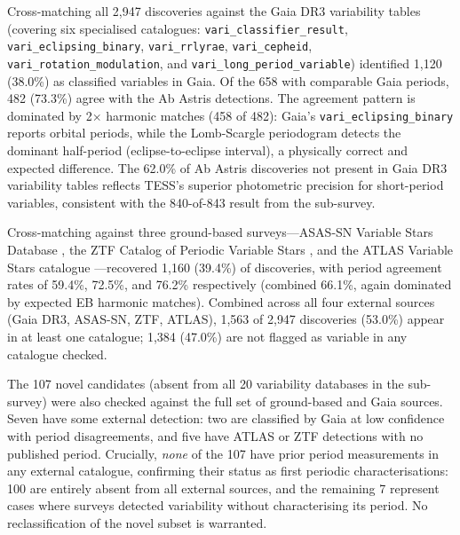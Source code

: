 \documentclass[11pt,a4paper]{article}
\begin{document}
Cross-matching all 2{,}947 discoveries against the Gaia DR3 variability tables (covering six specialised catalogues: \texttt{vari\_classifier\_result}, \texttt{vari\_eclipsing\_binary}, \texttt{vari\_rrlyrae}, \texttt{vari\_cepheid}, \texttt{vari\_rotation\_modulation}, and \texttt{vari\_long\_period\_variable}) identified 1{,}120 (38.0\%) as classified variables in Gaia. Of the 658 with comparable Gaia periods, 482 (73.3\%) agree with the Ab Astris detections. The agreement pattern is dominated by 2$\times$ harmonic matches (458 of 482): Gaia's \texttt{vari\_eclipsing\_binary} reports orbital periods, while the Lomb-Scargle periodogram detects the dominant half-period (eclipse-to-eclipse interval), a physically correct and expected difference. The 62.0\% of Ab Astris discoveries not present in Gaia DR3 variability tables reflects TESS's superior photometric precision for short-period variables, consistent with the 840-of-843 result from the sub-survey.

Cross-matching against three ground-based surveys---ASAS-SN Variable Stars Database \citep{Jayasinghe2018}, the ZTF Catalog of Periodic Variable Stars \citep{Chen2020}, and the ATLAS Variable Stars catalogue \citep{Heinze2018}---recovered 1{,}160 (39.4\%) of discoveries, with period agreement rates of 59.4\%, 72.5\%, and 76.2\% respectively (combined 66.1\%, again dominated by expected EB harmonic matches). Combined across all four external sources (Gaia DR3, ASAS-SN, ZTF, ATLAS), 1{,}563 of 2{,}947 discoveries (53.0\%) appear in at least one catalogue; 1{,}384 (47.0\%) are not flagged as variable in any catalogue checked.

The 107 novel candidates (absent from all 20 variability databases in the sub-survey) were also checked against the full set of ground-based and Gaia sources. Seven have some external detection: two are classified by Gaia at low confidence with period disagreements, and five have ATLAS or ZTF detections with no published period. Crucially, \emph{none} of the 107 have prior period measurements in any external catalogue, confirming their status as first periodic characterisations: 100 are entirely absent from all external sources, and the remaining 7 represent cases where surveys detected variability without characterising its period. No reclassification of the novel subset is warranted.
\end{document}
